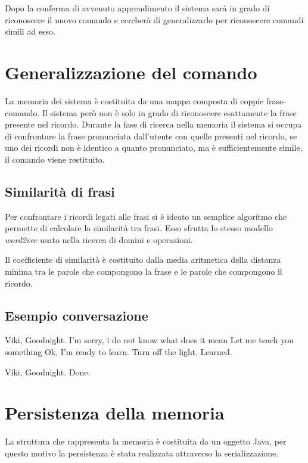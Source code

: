 \documentclass[twoside]{supsistudent}
\begin{document}
Dopo la conferma di avvenuto apprendimento il sistema sarà in grado di riconoscere il nuovo comando e cercherà di generalizzarlo per riconoscere comandi simili ad esso.
\section{Generalizzazione del comando}
La memoria dei sistema è costituita da una mappa composta di coppie frase-comando. Il sistema però non è solo in grado di riconoscere esattamente la frase presente nel ricordo.
Durante la fase di ricerca nella memoria il sistema si occupa di confrontare la frase pronunciata dall'utente con quelle presenti nel ricordo, se uno dei ricordi non è identico a quanto pronunciato, ma è sufficientemente simile, il comando viene restituito.
\subsection{Similarità di frasi}
Per confrontare i ricordi legati alle frasi si è ideato un semplice algoritmo che permette di calcolare la similarità tra frasi. Esso sfrutta lo stesso modello \textit{word2vec} usato nella ricerca di domini e operazioni.

Il coefficiente di similarità è costituito dalla media aritmetica della distanza minima tra le parole che compongono la frase e le parole che compongono il ricordo.

\subsection{Esempio conversazione}
\begin{dialogue}
 Viki, Goodnight.
 I'm sorry, i do not know what does it mean
 Let me teach you something
 Ok, I'm ready to learn.
 Turn off the light.
 Learned.
\end{dialogue}
\begin{dialogue}
 Viki, Goodnight.
 Done.
\end{dialogue}

\section{Persistenza della memoria}
La struttura che rappresenta la memoria è costituita da un oggetto Java, per questo motivo la persistenza è stata realizzata attraverso la serializzazione.
\end{document}
